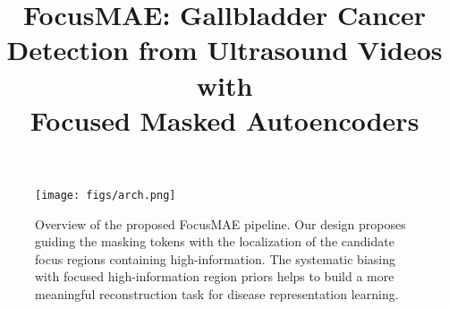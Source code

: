 \documentclass[10pt,twocolumn,letterpaper]{article}
\newcommand{\beginsupplement}{%
        \setcounter{table}{0}
        \renewcommand{\thetable}{S\arabic{table}}%
        \setcounter{figure}{0}
        \renewcommand{\thefigure}{S\arabic{figure}}%
     }
\begin{document}
\title{FocusMAE: Gallbladder Cancer Detection from Ultrasound Videos with \\ Focused Masked Autoencoders}

\maketitle







\begin{figure*}[t]
    \centering
    \texttt{[image: figs/arch.png]}
    \caption{Overview of the proposed FocusMAE pipeline. Our design proposes guiding the masking tokens with the localization of the candidate focus regions containing high-information. The systematic biasing with focused high-information region priors helps to build a more meaningful reconstruction task for disease representation learning. }
    \label{fig:enter-label}
\end{figure*}













\clearpage

{\small


}

% 
\end{document}
